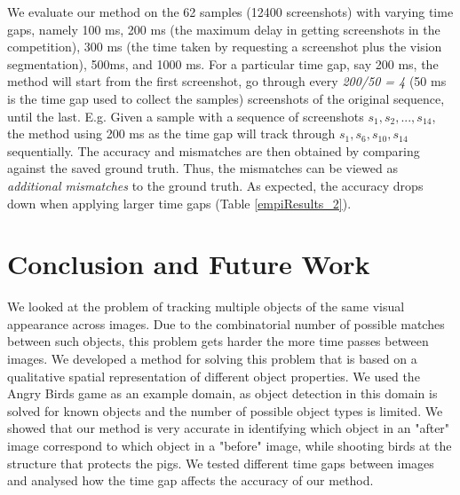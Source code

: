 \documentclass[letterpaper]{article}
\begin{document}
We evaluate our method on the 62 samples (12400 screenshots) with varying time gaps, namely 100 ms, 200 ms (the maximum delay in getting screenshots in the competition), 300 ms (the time taken by requesting a screenshot plus the vision segmentation), 500ms, and 1000 ms. For a particular time gap, say 200 ms, the method will start from the first screenshot, go through every \emph{200/50 = 4} (50 ms is the time gap used to collect the samples) screenshots of the original sequence, until the last. E.g. Given a sample with a sequence of screenshots $s_1, s_2, ..., s_{14}$, the method using 200 ms as the time gap will track through $s_1, s_6, s_{10}, s_{14}$ sequentially. The accuracy and mismatches are then obtained by comparing against the saved ground truth. Thus, the mismatches can be viewed as \emph{additional mismatches} to the ground truth. As expected, the accuracy drops down when applying larger time gaps (Table \ref{empiResults_2}). 
\vspace{-2mm}



\section{Conclusion and Future Work}

We looked at the problem of tracking multiple objects of the same visual appearance across images. Due to the combinatorial number of possible matches between such objects, this problem gets harder the more time passes between images. We developed a method for solving this problem that is based on a qualitative spatial representation of different object properties. We used the Angry Birds game as an example domain, as object detection in this domain is solved for known objects and the number of possible object types is limited. We showed that our method is very accurate in identifying which object in an "after" image correspond to which object in a "before" image, while shooting birds at the structure that protects the pigs. We tested different time gaps between images and analysed how the time gap affects the accuracy of our method. 
\end{document}
